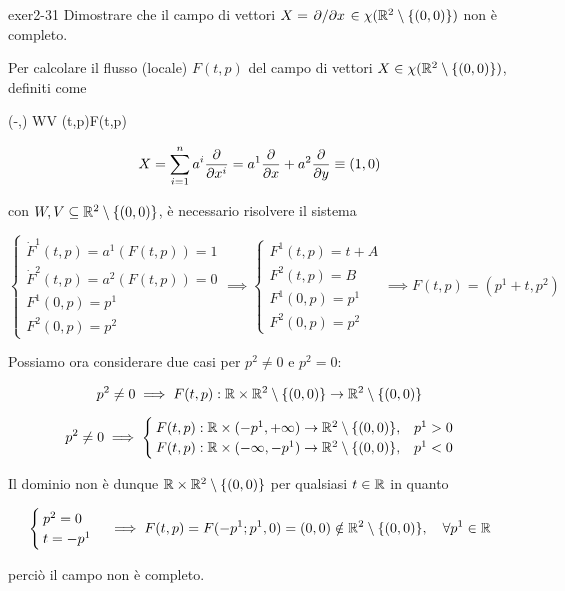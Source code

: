 {exer2-31}
{
Dimostrare che il campo di vettori $ X = \pdv*{x} \in \chi(\mathbb{R}^{2} \setminus \{(0,0)\}) $ non è completo.
}
{
Per calcolare il flusso (locale) $ F(t,p) $ del campo di vettori $ X \in \chi(\mathbb{R}^{2} \setminus \{(0,0)\}) $, definiti come

	{(-\varepsilon,\varepsilon) \times W}{V}
	{(t,p)}{F(t,p)}

\begin{equation}
	X = \sum_{i=1}^{n} a^{i} \pdv{x^{i}} = a^{1} \pdv{x} + a^{2} \pdv{y} \equiv (1,0)
\end{equation}

con $ W,V \subseteq \mathbb{R}^{2} \setminus \{(0,0)\} $, è necessario risolvere il sistema

\begin{equation}
	\begin{cases}
		\dot{F}^{1}(t,p) = a^{1}(F(t,p)) = 1 \\
		\dot{F}^{2}(t,p) = a^{2}(F(t,p)) = 0 \\
		F^{1}(0,p) = p^{1} \\
		F^{2}(0,p) = p^{2}
	\end{cases} %
	\implies %
	\begin{cases}
		F^{1}(t,p) = t + A \\
		F^{2}(t,p) = B \\
		F^{1}(0,p) = p^{1} \\
		F^{2}(0,p) = p^{2}
	\end{cases} %
	\implies %
	F(t,p) = (p^{1} + t, p^{2})
\end{equation}

Possiamo ora considerare due casi per $ p^{2} \neq 0 $ e $ p^{2} = 0 $:

\begin{equation}
	p^{2} \neq 0 %
	\implies %
	F(t,p) : \R \times \R^{2} \setminus \{(0,0)\} \to \R^{2} \setminus \{(0,0)\}
\end{equation}

\begin{equation}
	p^{2} \neq 0 %
	\implies %
	\begin{cases}
		F(t,p) : \R \times (- p^{1}, + \infty) \to \R^{2} \setminus \{(0,0)\}, & p^{1} > 0 \\
		F(t,p) : \R \times (- \infty, - p^{1}) \to \R^{2} \setminus \{(0,0)\}, & p^{1} < 0
	\end{cases}
\end{equation}

Il dominio non è dunque $ \mathbb{R} \times \mathbb{R}^{2} \setminus \{(0,0)\} $ per qualsiasi $ t \in \mathbb{R} $ in quanto

\begin{equation}
	\begin{cases}
		p^{2} = 0 \\
		t = - p^{1}
	\end{cases} %
	\implies %
	F(t,p) = F(- p^{1}; p^{1}, 0) = (0,0) \notin \R^{2} \setminus \{(0,0)\} %
	\qcomma \forall p^{1} \in \R
\end{equation}

perciò il campo non è completo.
}


